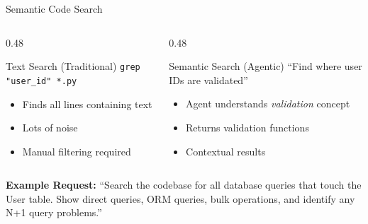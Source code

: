 \documentclass[aspectratio=169,11pt]{beamer}
\begin{document}
\begin{frame}{Semantic Code Search}
    \begin{columns}[T]
        \begin{column}{0.48\textwidth}
            \begin{alertblock}{Text Search (Traditional)}
                \texttt{grep "user\_id" *.py}
                \begin{itemize}
                    \item Finds all lines containing text
                    \item Lots of noise
                    \item Manual filtering required
                \end{itemize}
            \end{alertblock}
        \end{column}
        \begin{column}{0.48\textwidth}
            \begin{exampleblock}{Semantic Search (Agentic)}
                ``Find where user IDs are validated''
                \begin{itemize}
                    \item Agent understands \textit{validation} concept
                    \item Returns validation functions
                    \item Contextual results
                \end{itemize}
            \end{exampleblock}
        \end{column}
    \end{columns}

    \vspace{0.4cm}
    \textbf{Example Request:}
    ``Search the codebase for all database queries that touch the User table. Show direct queries, ORM queries, bulk operations, and identify any N+1 query problems.''

\end{frame}
\end{document}
